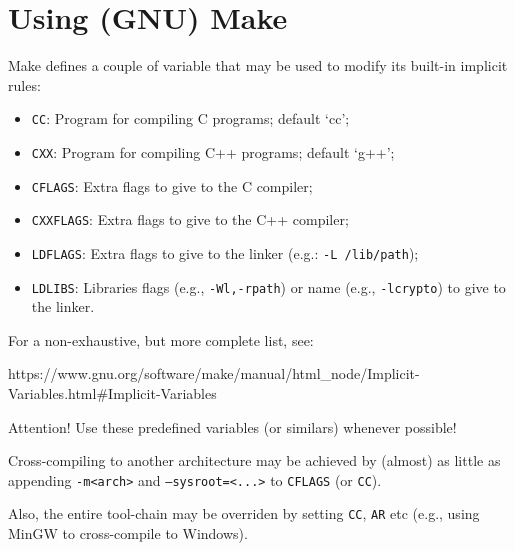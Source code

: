 \section{Using (GNU) Make}

\begin{frame}{\secname}
    Make defines a couple of variable that may be used to modify its built-in implicit rules:

    \begin{itemize}
        \item \texttt{CC}: Program for compiling C programs; default ‘cc’;
        \item \texttt{CXX}: Program for compiling C++ programs; default ‘g++’;
        \item \texttt{CFLAGS}: Extra flags to give to the C compiler;
        \item \texttt{CXXFLAGS}: Extra flags to give to the C++ compiler;
        \item \texttt{LDFLAGS}: Extra flags to give to the linker (e.g.: \texttt{-L /lib/path});
        \item \texttt{LDLIBS}: Libraries flags (e.g., \texttt{-Wl,-rpath}) or name (e.g., \texttt{-lcrypto}) to give to the linker.
    \end{itemize}

    For a non-exhaustive, but more complete list, see:

    https://www.gnu.org/software/make/manual/html_node/Implicit-Variables.html#Implicit-Variables
\end{frame}

\begin{frame}{\secname}
    \begin{alertblock}{Attention!}
        Use these predefined variables (or similars) whenever possible!
    \end{alertblock}

    Cross-compiling to another architecture may be achieved
    by (almost) as little as appending \texttt{-m<arch>} and
    \texttt{--sysroot=<...>} to \texttt{CFLAGS} (or \texttt{CC}).

    Also, the entire tool-chain may be overriden by setting
    \texttt{CC}, \texttt{AR} etc (e.g., using MinGW to
    cross-compile to Windows).
\end{frame}


